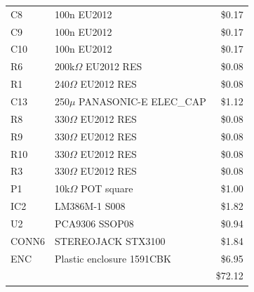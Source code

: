 \documentclass[bibtotocnumbered,abstract=on,paper=a4,fontsize=12pt,parskip=on,halfparskip=on]{scrartcl}		%
\begin{document}
\begin{table}[H]
\begin{tabularx}{\textwidth}{  p{2cm} X r }
      C8 & 100n EU2012 & \$0.17 \\
      C9 & 100n EU2012 & \$0.17 \\
      C10 & 100n EU2012 & \$0.17 \\
      R6 & 200k$\Omega$ EU2012 RES & \$0.08 \\
      R1 & 240$\Omega$ EU2012 RES & \$0.08 \\
      C13 & 250$\mu$ PANASONIC-E ELEC\_CAP & \$1.12 \\
      R8 & 330$\Omega$ EU2012 RES & \$0.08 \\
      R9 & 330$\Omega$ EU2012 RES & \$0.08 \\
      R10 & 330$\Omega$ EU2012 RES & \$0.08 \\
      R3 & 330$\Omega$ EU2012 RES & \$0.08 \\
      P1 & 10k$\Omega$ POT square & \$1.00 \\
      IC2 & LM386M-1 S008 & \$1.82 \\
      U2 & PCA9306 SSOP08 & \$0.94 \\
      CONN6 & STEREOJACK STX3100 & \$1.84 \\
      ENC & Plastic enclosure 1591CBK & \$6.95 \\
      \hline
      & & \$72.12\\


    \end{tabularx}
    \end{table}
  \clearpage
\end{document}
